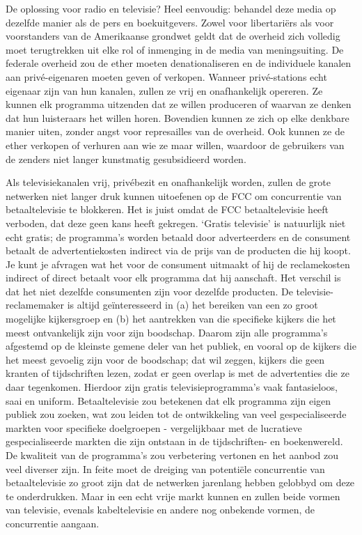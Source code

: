 \documentclass[
  a5paper,
  smalldemyvopaper,10pt,twoside,onecolumn,openright,extrafontsizes,hidelinks]{memoir}
\begin{document}
De oplossing voor radio en televisie? Heel eenvoudig: behandel deze
media op dezelfde manier als de pers en boekuitgevers. Zowel voor
libertariërs als voor voorstanders van de Amerikaanse grondwet geldt dat
de overheid zich volledig moet terugtrekken uit elke rol of inmenging in
de media van meningsuiting. De federale overheid zou de ether moeten
denationaliseren en de individuele kanalen aan privé-eigenaren moeten
geven of verkopen. Wanneer privé-stations echt eigenaar zijn van hun
kanalen, zullen ze vrij en onafhankelijk opereren. Ze kunnen elk
programma uitzenden dat ze willen produceren of waarvan ze denken dat
hun luisteraars het willen horen. Bovendien kunnen ze zich op elke
denkbare manier uiten, zonder angst voor represailles van de overheid.
Ook kunnen ze de ether verkopen of verhuren aan wie ze maar willen,
waardoor de gebruikers van de zenders niet langer kunstmatig
gesubsidieerd worden.

Als televisiekanalen vrij, privébezit en onafhankelijk worden, zullen de
grote netwerken niet langer druk kunnen uitoefenen op de FCC om
concurrentie van betaaltelevisie te blokkeren. Het is juist omdat de FCC
betaaltelevisie heeft verboden, dat deze geen kans heeft gekregen.
`Gratis televisie' is natuurlijk niet echt gratis; de programma's worden
betaald door adverteerders en de consument betaalt de advertentiekosten
indirect via de prijs van de producten die hij koopt. Je kunt je
afvragen wat het voor de consument uitmaakt of hij de reclamekosten
indirect of direct betaalt voor elk programma dat hij aanschaft. Het
verschil is dat het niet dezelfde consumenten zijn voor dezelfde
producten. De televisie-reclamemaker is altijd geïnteresseerd in (a) het
bereiken van een zo groot mogelijke kijkersgroep en (b) het aantrekken
van die specifieke kijkers die het meest ontvankelijk zijn voor zijn
boodschap. Daarom zijn alle programma's afgestemd op de kleinste gemene
deler van het publiek, en vooral op de kijkers die het meest gevoelig
zijn voor de boodschap; dat wil zeggen, kijkers die geen kranten of
tijdschriften lezen, zodat er geen overlap is met de advertenties die ze
daar tegenkomen. Hierdoor zijn gratis televisieprogramma's vaak
fantasieloos, saai en uniform. Betaaltelevisie zou betekenen dat elk
programma zijn eigen publiek zou zoeken, wat zou leiden tot de
ontwikkeling van veel gespecialiseerde markten voor specifieke
doelgroepen - vergelijkbaar met de lucratieve gespecialiseerde markten
die zijn ontstaan in de tijdschriften- en boekenwereld. De kwaliteit van
de programma's zou verbetering vertonen en het aanbod zou veel diverser
zijn. In feite moet de dreiging van potentiële concurrentie van
betaaltelevisie zo groot zijn dat de netwerken jarenlang hebben gelobbyd
om deze te onderdrukken. Maar in een echt vrije markt kunnen en zullen
beide vormen van televisie, evenals kabeltelevisie en andere nog
onbekende vormen, de concurrentie aangaan.
\end{document}
